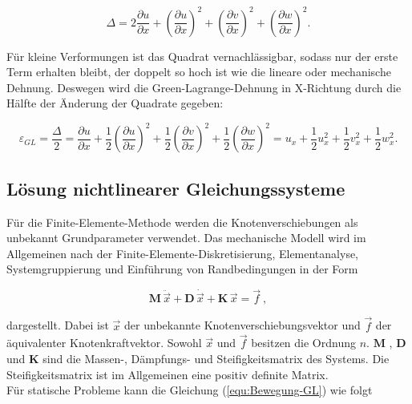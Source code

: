 	\begin{equation}\label{equ:2.-Änderung der Quadrate}
	\Delta = 2 \frac{\partial u}{\partial x} + \left( \frac{\partial u}{\partial x} \right)^{2} + \left( \frac{\partial v}{\partial x} \right)^{2} + \left( \frac{\partial w}{\partial x} \right)^{2} .
	\end{equation}
	
	Für kleine Verformungen ist das Quadrat vernachlässigbar, sodass nur der erste Term erhalten bleibt, der doppelt so hoch ist wie die lineare oder mechanische Dehnung. Deswegen wird die Green-Lagrange-Dehnung in X-Richtung durch die Hälfte der Änderung der Quadrate gegeben:
	
	\begin{equation}\label{equ:Green-Lagrange-Dehnung}
	\varepsilon_{GL} = \frac{\Delta}{2} = \frac{\partial u}{\partial x} + \frac{1}{2} \left( \frac{\partial u}{\partial x} \right)^{2} + \frac{1}{2} \left( \frac{\partial v}{\partial x} \right)^{2} +\frac{1}{2} \left( \frac{\partial w}{\partial x} \right)^{2} = u_{x}+ \frac{1}{2} u_{x}^{2} + \frac{1}{2} v_{x}^{2} + \frac{1}{2} w_{x}^{2} .
	\end{equation}
	
	\subsection{Lösung nichtlinearer Gleichungssysteme}\label{sec:Lösungsverfahren-n.lin_Dgl}
	
	Für die Finite-Elemente-Methode werden die Knotenverschiebungen als unbekannt Grundparameter verwendet. Das mechanische Modell wird im Allgemeinen nach der Finite-Elemente-Diskreti\-sierung, Elementanalyse, Systemgruppierung und Einführung von Randbedingungen in der Form
	
	\begin{equation}\label{equ:Bewegung-GL}
	\mathbf{M}\, \ddot{\vec{x}}+ \mathbf{D}\, \dot{\vec{x}}+ \mathbf{K}\, \vec{x} = \vec{f} \ ,
	\end{equation}
	
	dargestellt. Dabei ist $ \vec{x} $ der unbekannte Knotenverschiebungsvektor und $ \vec{f} $ der äquivalenter Knotenkraftvektor. Sowohl $ \vec{x} $ und $ \vec{f} $ besitzen die Ordnung $n$. $ \mathbf{M} $ , $ \mathbf{D} $ und $ \mathbf{K} $ sind die Massen-, Dämpfungs- und Steifigkeitsmatrix des Systems. Die Steifigkeitsmatrix ist im Allgemeinen eine positiv definite Matrix. \\
	
	Für statische Probleme kann die Gleichung (\ref{equ:Bewegung-GL}) wie folgt
	
